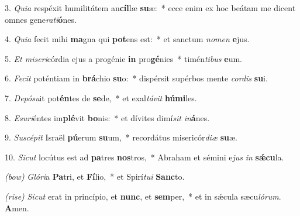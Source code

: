3. \textit{Quia} respéxit humilitátem an\textbf{cíl}læ \textbf{su}æ:~*
	ecce enim ex hoc beátam me dicent omnes gene\textit{ra}\textit{ti}\textbf{ó}nes.

4. \textit{Quia} fecit mihi \textbf{ma}gna qui \textbf{pot}ens est:~*
	et sanctum \textit{no}\textit{men} \textbf{e}jus.

5. \textit{Et miseri}córdia ejus a progénie \textbf{in} pro\textbf{gé}nies~*
	timén\textit{ti}\textit{bus} \textbf{e}um.

6. \textit{Fecit} poténtiam in \textbf{brá}chio \textbf{su}o:~*
	dispérsit supérbos mente \textit{cor}\textit{dis} \textbf{su}i.

7. \textit{Depósu}it pot\textbf{én}tes de \textbf{se}de,~*
	et exal\textit{tá}\textit{vit} \textbf{húmi}les.

8. \textit{Esuri}éntes im\textbf{plé}vit \textbf{bo}nis:~*
	et dívites dimí\textit{sit} \textit{in}\textbf{á}nes.

9. \textit{Suscépit} Israël \textbf{pú}erum \textbf{su}um,~*
	recordátus misericór\textit{di}\textit{æ} \textbf{su}æ.

10. \textit{Sicut} locútus est ad \textbf{pa}tres \textbf{nos}tros,~*
	Abraham et sémini e\textit{jus} \textit{in} \textbf{s\'{\ae}cu}la.

\textit{(bow)} \textit{Glóri}a \textbf{Pa}tri, et \textbf{Fí}lio,~*
	et Spirí\textit{tu}\textit{i} \textbf{Sanc}to.

\textit{(rise)} \textit{Sicut} erat in princípio, et \textbf{nunc}, et \textbf{sem}per,~*
	et in s\'{\ae}cula sæcu\textit{ló}\textit{rum}. \textbf{A}men.